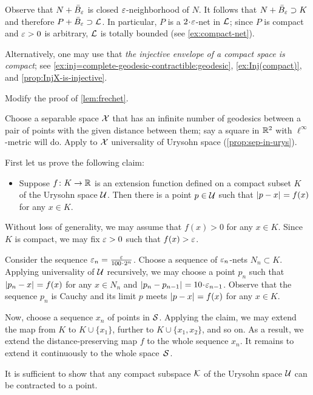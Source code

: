 Observe that $N+\bar B_\varepsilon$ is closed $\varepsilon$-neighborhood of $N$.
It follows that $N+\bar B_\varepsilon\supset K$ and therefore $P+\bar B_\varepsilon\supset \mathcal{L}$.
In particular, $P$ is a $2\cdot\eps$-net in $\mathcal{L}$;
since $P$ is compact and $\varepsilon>0$ is arbitrary, $\mathcal{L}$ is totally bounded (see \ref{ex:compact-net}).

Alternatively, one may use that \emph{the injective envelope of a compact space is compact}; see \ref{ex:inj=complete-geodesic-contractible:geodesic}, \ref{ex:Inj(compact)}, and \ref{prop:InjX-is-injective}.

Modify the proof of \ref{lem:frechet}.

Choose a separable space $\mathcal{X}$ that has an infinite number of geodesics between a pair of points with the given distance between them;
say a square in $\mathbb{R}^2$ with $\ell^\infty$-metric will do.
Apply to $\mathcal{X}$ universality of Urysohn space (\ref{prop:sep-in-urys}).

First let us prove the following claim:

\begin{itemize}
\item 
Suppose $f\colon K\to\mathbb{R}$ is an extension function defined on a compact subset $K$ of the Urysohn space $\mathcal{U}$.
Then there is a point $p\in \mathcal{U}$ such that 
$\dist{p}{x}{}=f(x)$ for any $x\in K$.
\end{itemize}

Without loss of generality, we may assume that $f(x)>0$ for any $x\in K$.
Since $K$ is compact, we may fix $\varepsilon>0$ such that $f(x)>\varepsilon$.

Consider the sequence $\eps_n=\tfrac\eps{100\cdot 2^n}$.
Choose a sequence of $\varepsilon_n$-nets $N_n\subset K$.
Applying universality of $\mathcal{U}$ recursively, we may choose a point $p_n$ such that $\dist{p_n}{x}{}=f(x)$ for any $x\in N_n$ and $\dist{p_n}{p_{n-1}}{}\z=10\cdot\eps_{n-1}$.
Observe that the sequence $p_n$ is Cauchy and its limit $p$ meets 
$\dist{p}{x}{}=f(x)$ for any $x\in K$.

Now, choose a sequence $x_n$ of points  in $\mathcal{S}$.
Applying the claim, we may extend the map from $K$ to $K\cup\{x_1\}$, further to $K\cup\{x_1,x_2\}$, and so on.
As a result, we extend the distance-preserving map $f$ to the whole sequence $x_n$.
It remains to extend it continuously to the whole space~$\mathcal{S}$.

It is sufficient to show that any compact subspace $\mathcal{K}$ of the Urysohn space $\mathcal{U}$ can be contracted to a point.

